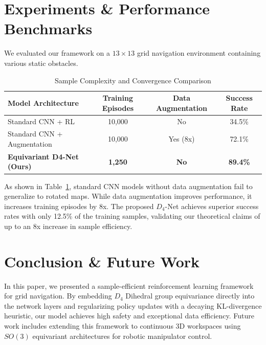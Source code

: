 \documentclass{article}
\begin{document}
\section{Experiments \& Performance Benchmarks}
We evaluated our framework on a $13 \times 13$ grid navigation environment containing various static obstacles. 

\begin{table}[h]
\centering
\caption{Sample Complexity and Convergence Comparison}
\label{tab:results}
\vskip 0.1in
\begin{tabular}{lccc}
\toprule
\textbf{Model Architecture} & \textbf{Training Episodes} & \textbf{Data Augmentation} & \textbf{Success Rate} \\
\midrule
Standard CNN + RL           & 10,000                     & No                         & 34.5\%                \\
Standard CNN + Augmentation & 10,000                     & Yes (8x)                   & 72.1\%                \\
\textbf{Equivariant D4-Net (Ours)} & \textbf{1,250}              & \textbf{No}                & \textbf{89.4\%}       \\
\bottomrule
\end{tabular}
\end{table}

As shown in Table~\ref{tab:results}, standard CNN models without data augmentation fail to generalize to rotated maps. While data augmentation improves performance, it increases training episodes by 8x. The proposed $D_4$-Net achieves superior success rates with only 12.5\% of the training samples, validating our theoretical claims of up to an 8x increase in sample efficiency.

\section{Conclusion \& Future Work}
In this paper, we presented a sample-efficient reinforcement learning framework for grid navigation. By embedding $D_4$ Dihedral group equivariance directly into the network layers and regularizing policy updates with a decaying KL-divergence heuristic, our model achieves high safety and exceptional data efficiency. Future work includes extending this framework to continuous 3D workspaces using $SO(3)$ equivariant architectures for robotic manipulator control.
\end{document}
